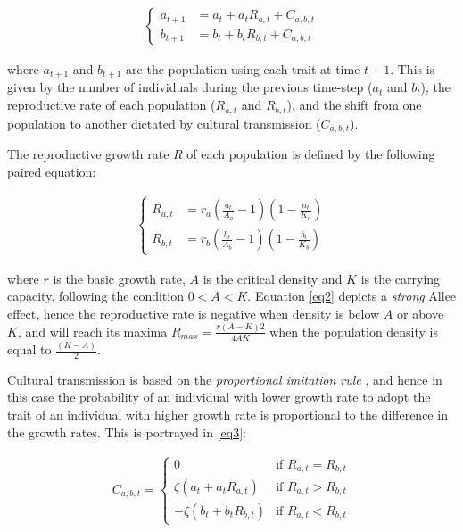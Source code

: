 \documentclass[3p,authoryear,twocolumn]{elsarticle} %
\begin{document}
\begin{align}
\begin{cases}
a_{t+1}& = a_t + a_t R_{a,t} + C_{a,b,t} \\
b_{t+1}& = b_t + b_t R_{b,t} + C_{a,b,t}
\end{cases}
\label{eq1}
\end{align}

where $a_{t+1}$ and $b_{t+1}$ are the population using each trait at time $t+1$. This is given by the number of individuals during the previous time-step ($a_t$ and $b_t$), the reproductive rate of each population ($R_{a,t}$ and $R_{b,t}$), and the shift from one population to another dictated by cultural transmission ($C_{a,b,t}$).

The reproductive growth rate $R$ of each population is defined by the following paired equation:

\begin{align}
\begin{cases}
R_{a,t}& = r_a (\frac{a_t}{A_a}-1)(1-\frac{a_t}{K_a})\\
R_{b,t}& = r_b (\frac{b_t}{A_b}-1)(1-\frac{b_t}{K_b}) 
\end{cases}
\label{eq2}
\end{align}

where $r$ is the basic growth rate, $A$ is the critical density and $K$ is the carrying capacity, following the condition $0<A < K$. Equation \eqref{eq2} depicts a \emph{strong} Allee effect, hence the reproductive rate is negative when density is below $A$ or above $K$, and will reach its maxima $R_{max}=\frac{r(A-K)2}{4AK}$ when the population density is equal to $\frac{(K-A)}{2}$. 

Cultural transmission is based on the \emph{proportional imitation rule} \citep{schlag1998}, and hence in this case the probability of an individual with lower growth rate to adopt the trait of an individual with higher growth rate is proportional to the difference in the growth rates. This is portrayed in \eqref{eq3}:

\begin{align}
\label{eq3}
C_{a,b,t} = 
\begin{cases}
0& \text{if } R_{a,t} = R_{b,t}\\
\zeta(a_t+a_tR_{a,t})& \text{if } R_{a,t} > R_{b,t}\\
-\zeta(b_t+b_tR_{b,t})& \text{if } R_{a,t} < R_{b,t}
\end{cases}
\end{align}
\end{document}
